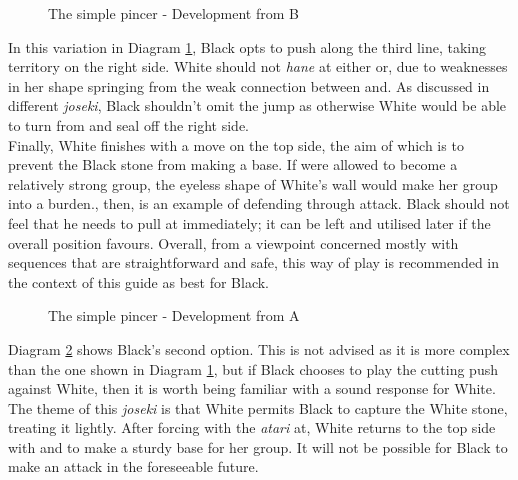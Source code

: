 \documentclass[a5paper,12pt,twoside]{book} %
\newcounter{joseki}                 %
\newcommand{\dref}[1]{Diagram \ref{#1}}
\begin{document}
\begin{figure}[!htbp]
 
\vspace{-0.6cm}\caption{The simple pincer - Development from B}
\label{3-4:pincer-simple-B}
\end{figure}

In this variation in \dref{3-4:pincer-simple-B}, Black opts to push along the third line, taking territory on the right side. White should not \textit{hane} at either{\large\whitestone[5]} or{\large\whitestone[7]}, due to weaknesses in her shape springing from the weak connection between{\large\whitestone[1]} and{\large\whitestone[3]}. As discussed in different \textit{joseki}, Black shouldn't omit the jump{\large\blackstone[8]} as otherwise White would be able to turn from{\large\whitestone[7]} and seal off the right side.\\

Finally, White finishes with a move on the top side, the aim of which is to prevent the Black stone{\large\blackstone[2]} from making a base. If{\large\blackstone[2]} were allowed to become a relatively strong group, the eyeless shape of White's wall would make her group into a burden.{\large\whitestone[9]}, then, is an example of defending through attack. Black should not feel that he needs to pull at{\large\blackstone[2]} immediately; it can be left and utilised later if the overall position favours. Overall, from a viewpoint concerned mostly with sequences that are straightforward and safe,  this way of play is recommended in the context of this guide as best for Black.\\

\begin{figure}[!htbp]
 
\vspace{-0.6cm}\caption{The simple pincer - Development from A}
\label{3-4:pincer-simple-A}
\end{figure}

\dref{3-4:pincer-simple-A} shows Black's second option. This is not advised as it is more complex than the one shown in \dref{3-4:pincer-simple-B}, but if Black chooses to play the cutting push{\large\blackstone[4]} against White, then it is worth being familiar with a sound response for White. The theme of this \textit{joseki} is that White permits Black to capture the White stone{\large\whitestone[3]}, treating it lightly. After forcing with the \textit{atari} at{\large\whitestone[7]}, White returns to the top side with{\large\whitestone[9]} and{\large\whitestone[11]} to make a sturdy base for her group. It will not be possible for Black to make an attack in the foreseeable future.\\
\end{document}
